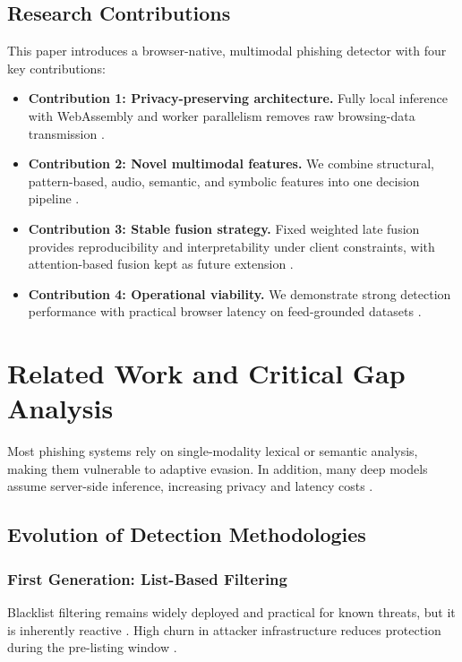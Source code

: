 \documentclass[conference]{IEEEtran}
\begin{document}
\subsection{Research Contributions}
This paper introduces a browser-native, multimodal phishing detector with four key contributions:
\begin{itemize}
\item \textbf{Contribution 1: Privacy-preserving architecture.} Fully local inference with WebAssembly and worker parallelism removes raw browsing-data transmission \cite{b39,b41}.
\item \textbf{Contribution 2: Novel multimodal features.} We combine structural, pattern-based, audio, semantic, and symbolic features into one decision pipeline \cite{b1,b14,b22,b23,b24,b27}.
\item \textbf{Contribution 3: Stable fusion strategy.} Fixed weighted late fusion provides reproducibility and interpretability under client constraints, with attention-based fusion kept as future extension \cite{b3,b4,b36,b50}.
\item \textbf{Contribution 4: Operational viability.} We demonstrate strong detection performance with practical browser latency on feed-grounded datasets \cite{b40,b46,b47}.
\end{itemize}

\section{Related Work and Critical Gap Analysis}
Most phishing systems rely on single-modality lexical or semantic analysis, making them vulnerable to adaptive evasion. In addition, many deep models assume server-side inference, increasing privacy and latency costs \cite{b5,b8,b13,b17,b38}.

\subsection{Evolution of Detection Methodologies}
\subsubsection{First Generation: List-Based Filtering}
Blacklist filtering remains widely deployed and practical for known threats, but it is inherently reactive \cite{b46,b47,b48,b49}. High churn in attacker infrastructure reduces protection during the pre-listing window \cite{b42,b43}.
\end{document}
